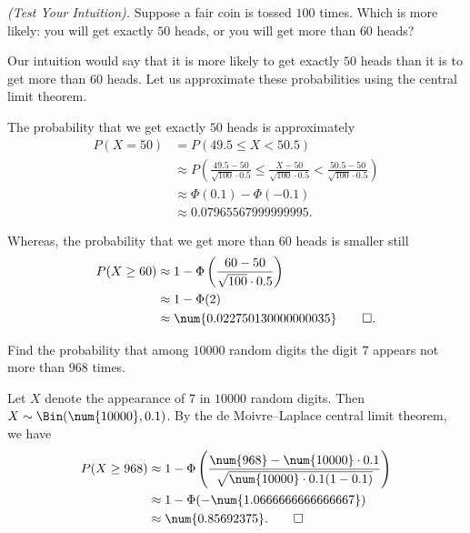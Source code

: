 \begin{problem}[Handout 14, \# 10]
  \emph{(Test Your Intuition).} Suppose a fair coin is tossed \(100\)
  times. Which is more likely: you will get exactly \(50\) heads, or you
  will get more than \(60\) heads?
\end{problem}
\begin{solution}
  Our intuition would say that it is more likely to get exactly \(50\)
  heads than it is to get more than \(60\) heads. Let us approximate these
  probabilities using the central limit theorem.

  The probability that we get exactly \(50\) heads is approximately
  \begin{align*}
    P(X=50)
    &=P(49.5\leq X<50.5)\\
    &\approx P\left(\frac{49.5-50}{\sqrt{100}\cdot 0.5}\leq
      \frac{X-50}{\sqrt{100}\cdot 0.5}<\frac{50.5-50}{\sqrt{100}\cdot
      0.5}\right)\\
    &\approx\Phi(0.1)-\Phi(-0.1)\\
    &\approx\num{0.07965567999999995}.
  \end{align*}

  Whereas, the probability that we get more than \(60\) heads is smaller
  still
  \begin{align*}
    P(X\geq 60)
    &\approx 1-\Phi\left(\frac{60-50}{\sqrt{100}\cdot 0.5}\right)\\
    &\approx 1-\Phi(2)\\
    &\approx\num{0.022750130000000035}\qedhere.
  \end{align*}
\end{solution}
\newpage

\begin{problem}[Handout 14, \# 11]
  Find the probability that among \(\num{10000}\) random digits the digit
  \(7\) appears not more than \(968\) times.
\end{problem}
\begin{solution}
  Let \(X\) denote the appearance of \(7\) in \(\num{10000}\) random
  digits. Then \(X\sim\Bin(\num{10000},0.1)\). By the de Moivre--Laplace
  central limit theorem, we have
  \begin{align*}
    P(X\geq 968)
    &\approx 1-\Phi\left(\frac{\num{968}-\num{10000}\cdot 0.1}
      {\sqrt{\num{10000}\cdot 0.1(1-0.1)}}\right)\\
    &\approx 1-\Phi(-\num{1.0666666666666667})\\
    &\approx\num{0.85692375}.\qedhere
  \end{align*}
\end{solution}
\newpage


